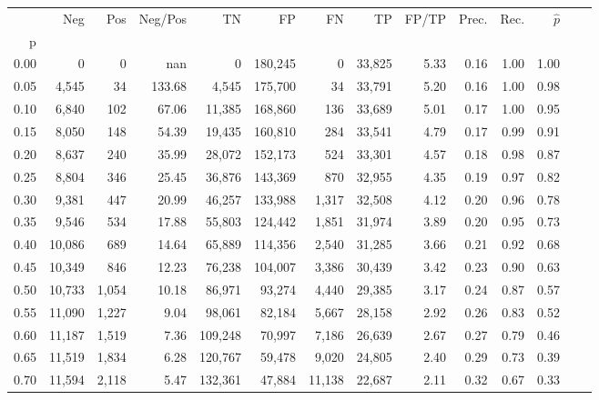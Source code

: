 \begin{tabular}{rrrrrrrrrrrrrr}
\toprule
{} &     Neg &    Pos & Neg/Pos &       TN &       FP &      FN &      TP & FP/TP & Prec. &  Rec. & $\hat{p}$ \\
p    &         &        &         &          &          &         &         &       &       &       &           \\
\midrule
0.00 &       0 &      0 &     nan &        0 &  180,245 &       0 &  33,825 &  5.33 &  0.16 &  1.00 &      1.00 \\
0.05 &   4,545 &     34 &  133.68 &    4,545 &  175,700 &      34 &  33,791 &  5.20 &  0.16 &  1.00 &      0.98 \\
0.10 &   6,840 &    102 &   67.06 &   11,385 &  168,860 &     136 &  33,689 &  5.01 &  0.17 &  1.00 &      0.95 \\
0.15 &   8,050 &    148 &   54.39 &   19,435 &  160,810 &     284 &  33,541 &  4.79 &  0.17 &  0.99 &      0.91 \\
0.20 &   8,637 &    240 &   35.99 &   28,072 &  152,173 &     524 &  33,301 &  4.57 &  0.18 &  0.98 &      0.87 \\
0.25 &   8,804 &    346 &   25.45 &   36,876 &  143,369 &     870 &  32,955 &  4.35 &  0.19 &  0.97 &      0.82 \\
0.30 &   9,381 &    447 &   20.99 &   46,257 &  133,988 &   1,317 &  32,508 &  4.12 &  0.20 &  0.96 &      0.78 \\
0.35 &   9,546 &    534 &   17.88 &   55,803 &  124,442 &   1,851 &  31,974 &  3.89 &  0.20 &  0.95 &      0.73 \\
0.40 &  10,086 &    689 &   14.64 &   65,889 &  114,356 &   2,540 &  31,285 &  3.66 &  0.21 &  0.92 &      0.68 \\
0.45 &  10,349 &    846 &   12.23 &   76,238 &  104,007 &   3,386 &  30,439 &  3.42 &  0.23 &  0.90 &      0.63 \\
0.50 &  10,733 &  1,054 &   10.18 &   86,971 &   93,274 &   4,440 &  29,385 &  3.17 &  0.24 &  0.87 &      0.57 \\
0.55 &  11,090 &  1,227 &    9.04 &   98,061 &   82,184 &   5,667 &  28,158 &  2.92 &  0.26 &  0.83 &      0.52 \\
0.60 &  11,187 &  1,519 &    7.36 &  109,248 &   70,997 &   7,186 &  26,639 &  2.67 &  0.27 &  0.79 &      0.46 \\
0.65 &  11,519 &  1,834 &    6.28 &  120,767 &   59,478 &   9,020 &  24,805 &  2.40 &  0.29 &  0.73 &      0.39 \\
0.70 &  11,594 &  2,118 &    5.47 &  132,361 &   47,884 &  11,138 &  22,687 &  2.11 &  0.32 &  0.67 &      0.33 \\

\end{tabular}
